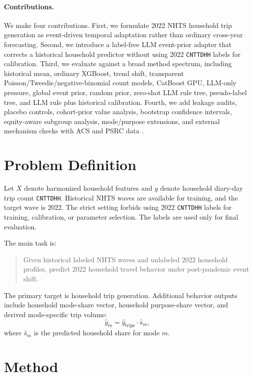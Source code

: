 \documentclass[11pt]{article}
\newcommand{\nhts}{\textsc{NHTS}}
\begin{document}
\paragraph{Contributions.}
We make four contributions.
First, we formulate 2022 \nhts{} household trip generation as event-driven temporal adaptation rather than ordinary cross-year forecasting.
Second, we introduce a label-free LLM event-prior adapter that corrects a historical household predictor without using 2022 \texttt{CNTTDHH} labels for calibration.
Third, we evaluate against a broad method spectrum, including historical mean, ordinary XGBoost, trend shift, transparent Poisson/Tweedie/negative-binomial count models, CatBoost GPU, LLM-only pressure, global event prior, random prior, zero-shot LLM rule tree, pseudo-label tree, and LLM rule plus historical calibration.
Fourth, we add leakage audits, placebo controls, cohort-prior value analysis, bootstrap confidence intervals, equity-aware subgroup analysis, mode/purpose extensions, and external mechanism checks with ACS and PSRC data \citep{burrows2024commuting,psrc2024regionaltravelstudy}.

\section{Problem Definition}

Let $X$ denote harmonized household features and $y$ denote household diary-day trip count \texttt{CNTTDHH}.
Historical \nhts{} waves are available for training, and the target wave is 2022.
The strict setting forbids using 2022 \texttt{CNTTDHH} labels for training, calibration, or parameter selection.
The labels are used only for final evaluation.

The main task is:
\begin{quote}
Given historical labeled \nhts{} waves and unlabeled 2022 household profiles, predict 2022 household travel behavior under post-pandemic event shift.
\end{quote}

The primary target is household trip generation.
Additional behavior outputs include household mode-share vector, household purpose-share vector, and derived mode-specific trip volume:
\begin{equation}
\widehat{y}_{m} = \widehat{y}_{\mathrm{trips}} \cdot \widehat{s}_{m},
\end{equation}
where $\widehat{s}_{m}$ is the predicted household share for mode $m$.

\section{Method}
\end{document}
